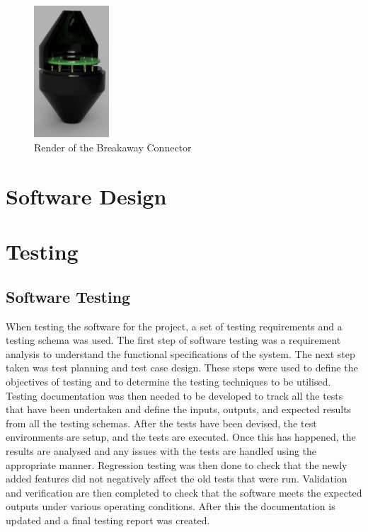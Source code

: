 \documentclass [12pt]{article}
\begin{document}
\begin{figure}[h]
    \centering
    \includegraphics[width=0.25\textwidth]{ConnectorRender.png}
    \caption{Render of the Breakaway Connector}
    \label{fig:connectorRender}
\end{figure}


\newpage
\section{Software Design} \label{sec:softwareDesign}

\newpage
\section{Testing}

\subsection{Software Testing}
When testing the software for the project, a set of testing requirements and a testing schema was used. The first step of software testing was a requirement analysis to understand the functional specifications of the system. The next step taken was test planning and test case design. These steps were used to define the objectives of testing and to determine the testing techniques to be utilised. Testing documentation was then needed to be developed to track all the tests that have been undertaken and define the inputs, outputs, and expected results from all the testing schemas. After the tests have been devised, the test environments are setup, and the tests are executed. Once this has happened, the results are analysed and any issues with the tests are handled using the appropriate manner.  Regression testing was then done to check that the newly added features did not negatively affect the old tests that were run. Validation and verification are then completed to check that the software meets the expected outputs under various operating conditions. After this the documentation is updated and a final testing report was created. 
\end{document}
